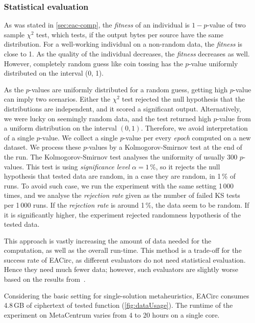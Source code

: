 \documentclass[
    digital,    %
    oneside,    %
    color,
    11pt,
    nocover,
    notable,
    nolof,
    nolot,
]{fithesis3}
\begin{document}
\subsubsection{\textbf{Statistical evaluation}}
\label{subsubsec:method-spec-ss-stat}

As was stated in \cref{sec:eac-comp}, the \textit{fitness} of an individual is $1 - p$-value of two sample $\chi^{2}$ test, which tests, if the output bytes per source have the same distribution. For a well-working individual on a non-random data, the \textit{fitness} is close to 1. As the quality of the individual decreases, the \textit{fitness} decreases as well. However, completely random guess like coin tossing has the $p$-value uniformly distributed on the interval (0, 1).

As the $p$-values are uniformly distributed for a random guess, getting high $p$-value can imply two scenarios. Either the $\chi^{2}$ test rejected the null hypothesis that the distributions are independent, and it scored a significant output. Alternatively, we were lucky on seemingly random data, and the test returned high $p$-value from a uniform distribution on the interval $(0, 1)$. Therefore, we avoid interpretation of a single $p$-value. We collect a single $p$-value per every \textit{epoch} computed on a new dataset. We process these $p$-values by a Kolmogorov-Smirnov test at the end of the run. The Kolmogorov-Smirnov test analyses the uniformity of usually 300 $p$-values. This test is using \textit{significance level} $\alpha = 1\,\%$, so it rejects the null hypothesis that tested data are random, in a case they are random, in 1\,\% of runs. To avoid such case, we run the experiment with the same setting 1\,000 times, and we analyse the \textit{rejection rate} given as the number of failed KS tests per 1\,000 runs. If the \textit{rejection rate} is around 1\,\%, the data seem to be random. If it is significantly higher, the experiment rejected randomness hypothesis of the tested data.

This approach is vastly increasing the amount of data needed for the computation, as well as the overall run-time. This method is a trade-off for the success rate of EACirc, as different evaluators do not need statistical evaluation. Hence they need much fewer data; however, such evaluators are slightly worse based on the results from~\cite{svenda2013towards}.

Considering the basic setting for single-solution metaheuristics, EACirc consumes 4.8\,GB of ciphertext of tested function (\cref{fig:dataUsage}). The runtime of the experiment on MetaCentrum varies from 4 to 20 hours on a single core.
\end{document}
